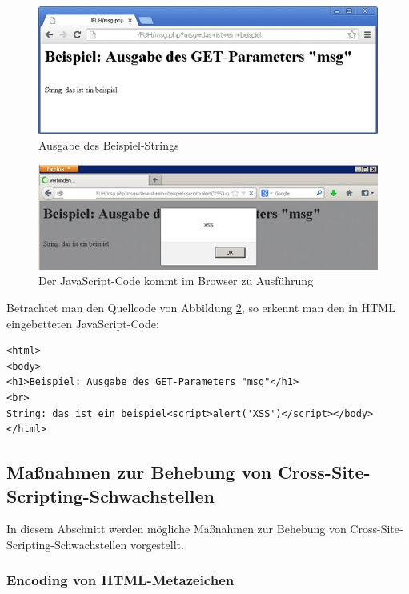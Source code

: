 \begin{figure}[htbp]
 \centering
 \includegraphics[scale=.75]{abbildungen/xss_1}
 \caption{Ausgabe des Beispiel-Strings}
 \label{fig:xss_1} 
\end{figure}

\begin{figure}[htbp]
 \centering
 \includegraphics[scale=.75]{abbildungen/xss_2}
 \caption{Der JavaScript-Code kommt im Browser zu Ausführung}
 \label{fig:xss_2} 
\end{figure}

Betrachtet man den Quellcode von Abbildung \ref{fig:xss_2}, so 
erkennt man den in HTML eingebetteten JavaScript-Code:

\begin{lstlisting}[basicstyle=\ttfamily\footnotesize]
<html>
<body>
<h1>Beispiel: Ausgabe des GET-Parameters "msg"</h1>
<br>
String: das ist ein beispiel<script>alert('XSS')</script></body>
</html>
\end{lstlisting}

\subsection{Maßnahmen zur Behebung von Cross-Site-Scripting-Schwachstellen}
	
In diesem Abschnitt werden mögliche Maßnahmen zur Behebung von 
Cross-Site-Scripting-Schwachstellen vorgestellt.

\subsubsection{Encoding von HTML-Metazeichen}
	
